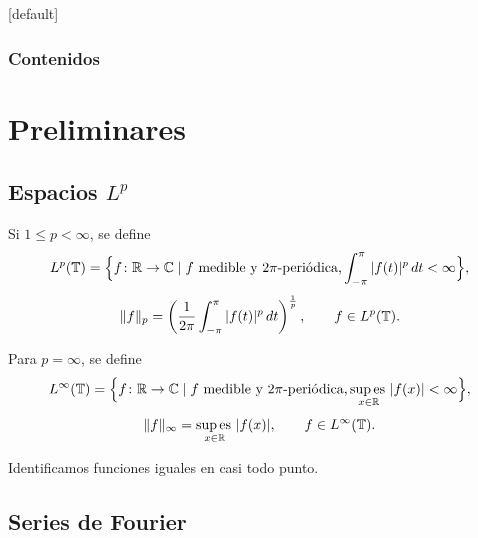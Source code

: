 \documentclass{beamer}
\begin{document}
\begin{frame}[plain]
  \begin{columns}
    \begin{column}{1.01\textwidth}
      \titlepage
    \end{column}
  \end{columns}
\end{frame}


\small
{}

{
[default]
\begin{frame}
\frametitle{\LARGE{Contenidos}}
\tableofcontents[pausesections]
\end{frame}
}

\section{Preliminares}

\subsection{Espacios \texorpdfstring{$L^p$}{Lp}}

\begin{frame}
    \begin{block}{}
        Si $1\leq p<\infty$, se define
        \[L^p(\mathbb T) = \Bigl\{f \colon \mathbb R \to \mathbb C \mid f \textup{ medible y } 2\pi\textup{-periódica,} \int_{-\pi}^{\pi} |f(t)|^p \, dt < \infty \Bigr\},\]
        \[\|f\|_p = \left(\frac{1}{2\pi}\int_{-\pi}^{\pi} |f(t)|^p \, dt\right)^{\frac{1}{p}}, \qquad f \in L^p(\mathbb T).\]
    \end{block}
    \pause
    \begin{block}{}
        Para $p = \infty$, se define
        \[L^\infty(\mathbb T) = \Bigl\{f \colon \mathbb R \to \mathbb C \mid f \textup{ medible y } 2\pi\textup{-periódica,} \operatorname*{sup\,es\,}_{x \in \mathbb R} |f(x)| < \infty\Bigr\},\]
        \[\|f\|_{\infty} = \operatorname*{sup\,es\,}_{x \in \mathbb R} |f(x)|, \qquad f \in L^\infty(\mathbb T).\]
    \end{block}
    \pause
    Identificamos funciones iguales en casi todo punto.
\end{frame}

\subsection{Series de Fourier}
\end{document}
